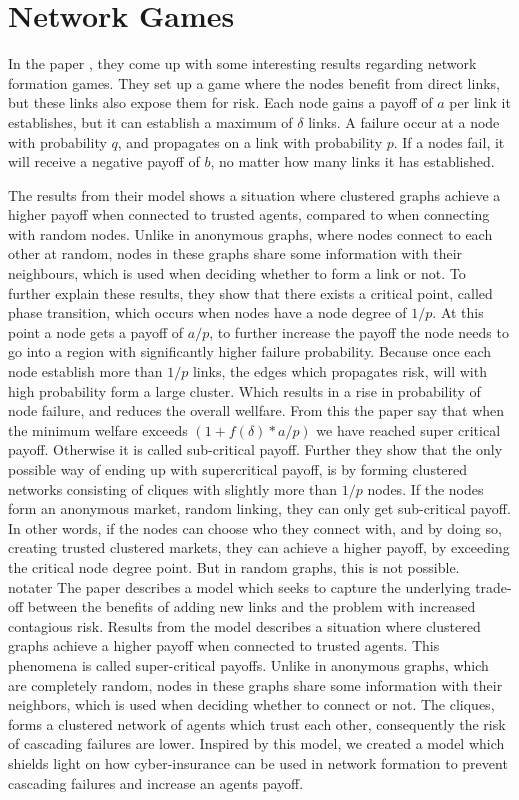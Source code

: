 \chapter{Network Games}
\label{chp:networkgames} 

In the paper \cite{contagion}, they come up with some interesting results regarding network formation games. 
They set up a game where the nodes benefit from direct links, but these links also expose them for risk. 
Each node gains a payoff of  $a$ per link it establishes, but it can establish a maximum of $\delta$ links.
A failure occur at a node with probability $q$, and propagates on a link with probability $p$. If a nodes fail, it will receive a negative payoff of $b$, no matter how many links it has established.

The results from their model shows a situation where clustered graphs achieve a higher payoff when connected to trusted agents, compared to when connecting with random nodes. Unlike in anonymous graphs, where nodes connect to each other at random, nodes in these graphs share some information with their neighbours, which is used when deciding whether to form a link or not. 
To further explain these results, they show that there exists a critical point, called phase transition, which occurs when nodes have a node degree of $1/p$. 
At this point a node gets a payoff of $a/p$, to further increase the payoff the node needs to go into a region with significantly higher failure probability. 
Because once each node establish more than $1/p$ links, the edges which propagates risk, will with high probability form a large cluster. Which results in a rise in probability of node failure, and reduces the overall wellfare.
From this the paper say that when the minimum welfare exceeds 
$(1+f(\delta)*a/p)
$
we have reached super critical payoff. Otherwise it is called sub-critical payoff. 
Further they show that the only possible way of ending up with supercritical payoff, is by forming clustered networks consisting of cliques with slightly more than $1/p$ nodes. 
If the nodes form an anonymous market, random linking, they can only get sub-critical payoff. 
In other words, if the nodes can choose who they connect with, and by doing so, creating trusted clustered markets, they can achieve a higher payoff, by exceeding the critical node degree point. But in random graphs, this is not possible.  
\\notater
The paper \cite{contagion} describes a model which seeks to capture the underlying trade-off between the benefits of adding new links and the problem with increased contagious risk. Results from the model describes a situation where clustered graphs achieve a higher payoff when connected to trusted agents. This phenomena is called super-critical payoffs. Unlike in anonymous graphs, which are completely random, nodes in these graphs share some information with their neighbors, which is used when deciding whether to connect or not. The cliques, forms a clustered network of agents which trust each other, consequently the risk of cascading failures are lower.
Inspired by this model, we created a model which shields light on how cyber-insurance can be used in network formation to prevent cascading failures and increase an agents payoff.  

